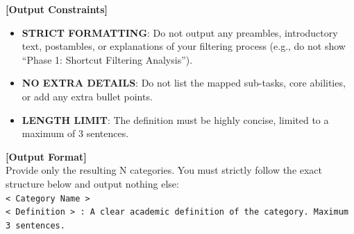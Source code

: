 \begin{table}[t!]
\begin{tcolorbox}[colback=gray!5, colframe=gray!50, arc=2mm, boxrule=0.5pt, left=1.5mm, right=1.5mm, top=1mm, bottom=1mm]
        \textbf{[Output Constraints]}
        \begin{itemize}[leftmargin=*, nosep]
            \item \textbf{STRICT FORMATTING}: Do not output any preambles, introductory text, postambles, or explanations of your filtering process (e.g., do not show ``Phase 1: Shortcut Filtering Analysis'').
            \item \textbf{NO EXTRA DETAILS}: Do not list the mapped sub-tasks, core abilities, or add any extra bullet points.
            \item \textbf{LENGTH LIMIT}: The definition must be highly concise, limited to a maximum of 3 sentences.
        \end{itemize}
        \vspace{1mm}
        
        \textbf{[Output Format]} \\
        Provide only the resulting N categories. You must strictly follow the exact structure below and output nothing else: \\
        
        \texttt{< Category Name >} \\
        \texttt{< Definition > : A clear academic definition of the category. Maximum 3 sentences.}
        \end{tcolorbox}
        \caption{Prompt template used to derive candidate video-native challenge clusters from source-benchmark metadata.}
        \label{tab:prompt_taxonomy}
        \vspace{-5mm}
        \end{table}


